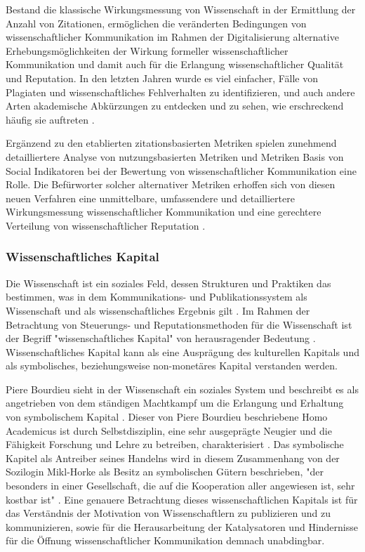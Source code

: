 Bestand die klassische Wirkungsmessung von Wissenschaft in der Ermittlung der Anzahl von Zitationen, ermöglichen die veränderten Bedingungen von wissenschaftlicher Kommunikation im Rahmen der Digitalisierung alternative Erhebungsmöglichkeiten der Wirkung formeller wissenschaftlicher Kommunikation und damit auch für die Erlangung wissenschaftlicher Qualität und Reputation. In den letzten Jahren wurde es viel einfacher, Fälle von Plagiaten und wissenschaftliches Fehlverhalten zu identifizieren, und auch andere Arten akademische Abkürzungen zu entdecken und zu sehen, wie erschreckend häufig sie auftreten \cite{rekdal_2014_academic}.

Ergänzend zu den etablierten zitationsbasierten Metriken spielen zunehmend detailliertere Analyse von nutzungsbasierten Metriken und Metriken Basis von Social Indikatoren \cite{peters_2015_research} bei der Bewertung von wissenschaftlicher Kommunikation eine Rolle. Die Befürworter solcher alternativer Metriken erhoffen sich von diesen neuen Verfahren eine unmittelbare, umfassendere und detailliertere Wirkungsmessung wissenschaftlicher Kommunikation und eine gerechtere Verteilung von wissenschaftlicher Reputation \cite{peters_2015_research} \cite{cite:17} \cite{dora_2013}.

\subsubsection{Wissenschaftliches Kapital}

Die Wissenschaft ist ein soziales Feld, dessen Strukturen und Praktiken das bestimmen, was in dem Kommunikations- und Publikationssystem als Wissenschaft und als wissenschaftliches Ergebnis gilt \cite{mikl_2010_soziologie}. Im Rahmen der Betrachtung von Steuerungs- und Reputationsmethoden für die Wissenschaft ist der Begriff "wissenschaftliches Kapital" von herausragender Bedeutung \cite{Barl_sius_2008}. Wissenschaftliches Kapital kann als eine Ausprägung des kulturellen Kapitals und als symbolisches, beziehungsweise non-monetäres Kapital \cite{irmer2011} \cite{hagner_2015_sache_buches} \cite{bourdieu_1988_homo} verstanden werden.

Piere Bourdieu sieht in der Wissenschaft ein soziales System und beschreibt es als angetrieben von dem ständigen Machtkampf um die Erlangung und Erhaltung von symbolischem Kapital \cite{bourdieu_1988_homo}. Dieser von Piere Bourdieu beschriebene Homo Academicus ist durch Selbstdisziplin, eine sehr ausgeprägte Neugier und die Fähigkeit Forschung und Lehre zu betreiben, charakterisiert \cite{bourdieu_1988_homo}. Das symbolische Kapitel als Antreiber seines Handelns wird in diesem Zusammenhang von der Sozilogin Mikl-Horke als Besitz an symbolischen Gütern beschrieben, "der besonders in einer Gesellschaft, die auf die Kooperation aller angewiesen ist, sehr kostbar ist" \cite{mikl_2010_soziologie}. Eine genauere Betrachtung dieses wissenschaftlichen Kapitals ist für das Verständnis der Motivation von Wissenschaftlern zu publizieren und zu kommunizieren, sowie für die Herausarbeitung der Katalysatoren und Hindernisse für die Öffnung wissenschaftlicher Kommunikation demnach unabdingbar.

